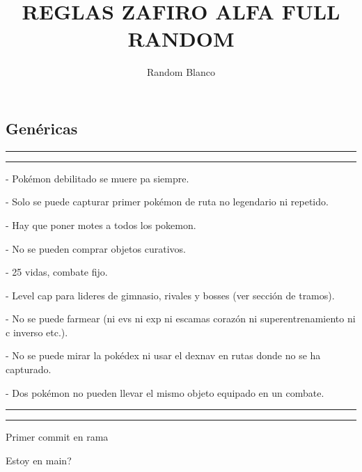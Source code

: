 \documentclass[11pt,a4paper,draft]{article}
\title{\bf REGLAS ZAFIRO ALFA FULL RANDOM}
\author{Random Blanco}
\date{}
\begin{document}
\pagestyle{empty}

\maketitle

\thispagestyle{empty}

\subsection*{\bf Genéricas}
\hrule\hrule
\vspace{2mm}


- Pokémon debilitado se muere pa siempre.

- Solo se puede capturar primer pokémon de ruta no legendario ni repetido.

- Hay que poner motes a todos los pokemon.

- No se pueden comprar objetos curativos.

- 25 vidas, combate fijo.

- Level cap para lideres de gimnasio, rivales y bosses (ver sección de tramos).

- No se puede farmear (ni evs ni exp ni escamas corazón ni superentrenamiento ni c inverso etc.).

- No se puede mirar la pokédex ni usar el dexnav en rutas donde no se ha capturado.

- Dos pokémon no pueden llevar el mismo objeto equipado en un combate.


\hrule\hrule
\vspace{2mm}
Primer commit en rama

Estoy en main?
\end{document}
